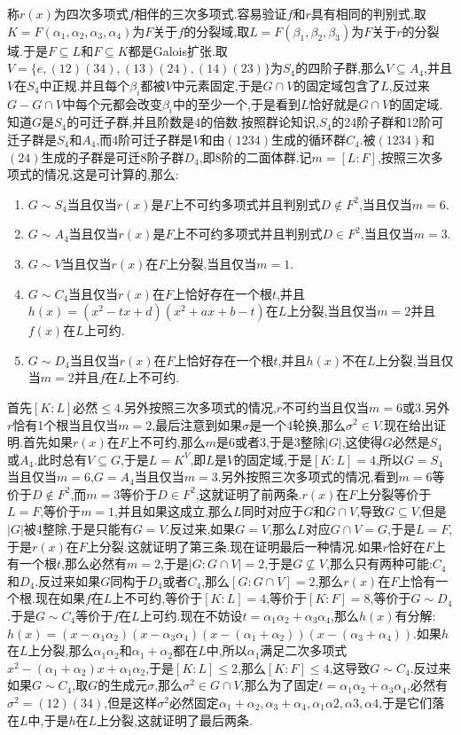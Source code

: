 称$r(x)$为四次多项式$f$相伴的三次多项式.容易验证$f$和$r$具有相同的判别式,取$K=F(\alpha_1,\alpha_2,\alpha_3,\alpha_4)$为$F$关于$f$的分裂域,取$L=F(\beta_1,\beta_2,\beta_3)$为$F$关于$r$的分裂域.于是$F\subseteq L$和$F\subseteq K$都是Galois扩张.取$V=\{e,(12) (34),(13)(24),(14)(23)\}$为$S_4$的四阶子群,那么$V\subseteq A_4$,并且$V$在$S_4$中正规.并且每个$\beta_i$都被$V$中元素固定,于是$G\cap V$的固定域包含了$L$,反过来$G-G\cap V$中每个元都会改变$\beta_i$中的至少一个,于是看到$L$恰好就是$G\cap V$的固定域.知道$G$是$S_4$的可迁子群,并且阶数是4的倍数.按照群论知识,$S_4$的24阶子群和12阶可迁子群是$S_4$和$A_4$,而4阶可迁子群是$V$和由$(1234)$生成的循环群$C_4$.被$(1234)$和$(24)$生成的子群是可迁8阶子群$D_4$,即8阶的二面体群.记$m=[L:F]$,按照三次多项式的情况,这是可计算的,那么:
\begin{enumerate}
	\item $G\sim S_4$当且仅当$r(x)$是$F$上不可约多项式并且判别式$D\not\in F^2$,当且仅当$m=6$.
	\item $G\sim A_4$当且仅当$r(x)$是$F$上不可约多项式并且判别式$D\in F^2$,当且仅当$m=3$.
	\item $G\sim V$当且仅当$r(x)$在$F$上分裂,当且仅当$m=1$.
	\item $G\sim C_4$当且仅当$r(x)$在$F$上恰好存在一个根$t$,并且$h(x)= (x^2-tx+d)(x^2+ax+b-t)$在$L$上分裂,当且仅当$m=2$并且$f(x)$在$L$上可约.
	\item $G\sim D_4$当且仅当$r(x)$在$F$上恰好存在一个根$t$,并且$h(x)$不在$L$上分裂,当且仅当$m=2$并且$f$在$L$上不可约.
\end{enumerate}

首先$[K:L]$必然$\le4$.另外按照三次多项式的情况,$r$不可约当且仅当$m=6$或3.另外$r$恰有1个根当且仅当$m=2$,最后注意到如果$\sigma$是一个4轮换,那么$\sigma^2\in V$.现在给出证明.首先如果$r(x)$在$F$上不可约,那么$m$是6或者3,于是3整除$|G|$,这使得$G$必然是$S_4$或$A_4$.此时总有$V\subseteq G$,于是$L=K^V$,即$L$是$V$的固定域,于是$[K:L]=4$,所以$G=S_4$当且仅当$m=6$,$G=A_4$当且仅当$m=3$.另外按照三次多项式的情况,看到$m=6$等价于$D\not\in F^2$,而$m=3$等价于$D\in F^2$,这就证明了前两条.$r(x)$在$F$上分裂等价于$L=F$,等价于$m=1$,并且如果这成立,那么$L$同时对应于$G$和$G\cap V$,导致$G\subseteq V$,但是$|G|$被4整除,于是只能有$G=V$.反过来,如果$G=V$,那么$L$对应$G\cap V=G$,于是$L=F$,于是$r(x)$在$F$上分裂.这就证明了第三条.现在证明最后一种情况.如果$r$恰好在$F$上有一个根$t$,那么必然有$m=2$,于是$|G:G\cap V|=2$,于是$G\not\subseteq V$,那么只有两种可能:$C_4$和$D_4$.反过来如果$G$同构于$D_4$或者$C_4$,那么$[G:G\cap V]=2$,那么$r(x)$在$F$上恰有一个根.现在如果$f$在$L$上不可约,等价于$[K:L]=4$,等价于$[K:F]=8$,等价于$G\sim D_4$.于是$G\sim C_4$等价于$f$在$L$上可约.现在不妨设$t=\alpha_1\alpha_2+\alpha_3\alpha_4$,那么$h(x)$有分解:$h(x)= (x-\alpha_1\alpha_2)(x-\alpha_3\alpha_4)(x-(\alpha_1+\alpha_2))(x-(\alpha_3+\alpha_4))$.如果$h$在$L$上分裂,那么$\alpha_1\alpha_2$和$\alpha_1+\alpha_2$都在$L$中,所以$\alpha_1$满足二次多项式$x^2- (\alpha_1+\alpha_2)x+\alpha_1\alpha_2$,于是$[K:L]\le2$,那么$[K:F]\le4$,这导致$G\sim C_4$.反过来如果$G\sim C_4$,取$G$的生成元$\sigma$,那么$\sigma^2\in G\cap V$,那么为了固定$t=\alpha_1\alpha_2+\alpha_3\alpha_4$,必然有$\sigma^2=(12)(34)$,但是这样$\sigma^2$必然固定$\alpha_1+\alpha_2,\alpha_3+\alpha_4,\alpha_1\alpha2,\alpha3,\alpha4$,于是它们落在$L$中,于是$h$在$L$上分裂,这就证明了最后两条.

